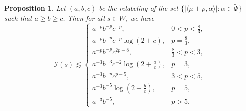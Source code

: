 \documentclass{amsart}
\numberwithin{equation}{section}
\newtheorem{prop}[thm]{Proposition}
\numberwithin{equation}{section}
\begin{document}
\begin{prop}\label{prop: I}
Let $(a,b,c)$ be the relabeling of the set 
$\{ |\langle \mu+\rho, \alpha \rangle| : \alpha \in \widetilde{\Phi} \}$ such that $a\ge b\ge c$. Then for all $s\in W$, we have 
    \[
\mathcal I(s)\lesssim
\begin{cases}
a^{-p}b^{-p}c^{-p}, & 0<p<\frac83,\\[1mm]
a^{-p}b^{-p}c^{-p}\log(2+c), & p=\frac83,\\[1mm]
a^{-p}b^{-p}c^{2p-8}, & \frac83<p<3,\\[1mm]
a^{-3}b^{-3}c^{-2}\log\left(2+\frac ac\right), & p=3, \\[1mm]
a^{-3}b^{-p}c^{p-5}, & 3<p<5,\\[1mm]
a^{-3}b^{-5}\log\left(2+\frac bc\right), & p=5,\\[1mm]
a^{-3}b^{-5}, & p>5.
\end{cases}
\]
\end{prop}
\end{document}
